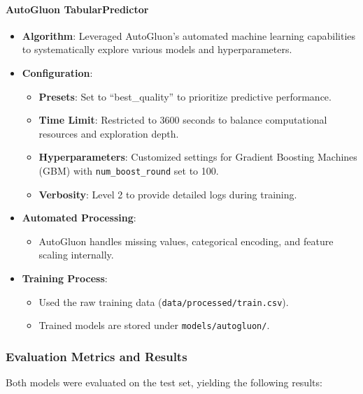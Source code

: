 \documentclass{article}
\begin{document}
\paragraph{AutoGluon TabularPredictor}

\begin{itemize}[leftmargin=*]
    \item \textbf{Algorithm}: Leveraged AutoGluon's automated machine learning capabilities to systematically explore various models and hyperparameters.
    \item \textbf{Configuration}:
        \begin{itemize}[leftmargin=*]
            \item \textbf{Presets}: Set to ``best\_quality'' to prioritize predictive performance.
            \item \textbf{Time Limit}: Restricted to 3600 seconds to balance computational resources and exploration depth.
            \item \textbf{Hyperparameters}: Customized settings for Gradient Boosting Machines (GBM) with \texttt{num\_boost\_round} set to 100.
            \item \textbf{Verbosity}: Level 2 to provide detailed logs during training.
        \end{itemize}
    \item \textbf{Automated Processing}:
        \begin{itemize}[leftmargin=*]
            \item AutoGluon handles missing values, categorical encoding, and feature scaling internally.
        \end{itemize}
    \item \textbf{Training Process}:
        \begin{itemize}[leftmargin=*]
            \item Used the raw training data (\texttt{data/processed/train.csv}).
            \item Trained models are stored under \texttt{models/autogluon/}.
        \end{itemize}
\end{itemize}

\subsubsection{Evaluation Metrics and Results}

Both models were evaluated on the test set, yielding the following results:
\end{document}
